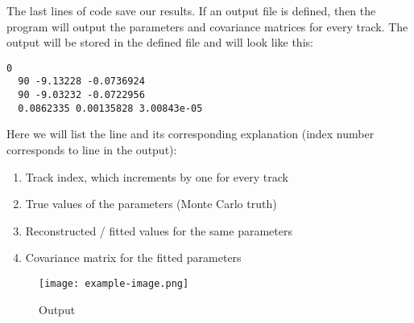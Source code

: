 \documentclass{article}
\begin{document}
\noindent The last lines of code save our results.
If an output file is defined, then the program will output the parameters and covariance matrices for every track.
The output will be stored in the defined file and will look like this:
\begin{lstlisting}[caption=Output]
  0 
  90 -9.13228 -0.0736924
  90 -9.03232 -0.0722956
  0.0862335 0.00135828 3.00843e-05
\end{lstlisting}
Here we will list the line and its corresponding explanation (index number corresponds to line in the output):
\begin{enumerate}
  \item Track index, which increments by one for every track
  \item True values of the parameters (Monte Carlo truth)
  \item Reconstructed / fitted values for the same parameters
  \item Covariance matrix for the fitted parameters
\end{enumerate}
\begin{figure}[H]
    \centering
    \texttt{[image: example-image.png]} 
    \caption{Output}
    \label{fig:example}
  \end{figure}
  
\end{document}
